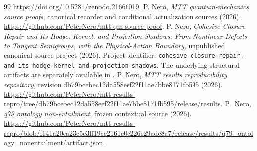 \documentclass[11pt,a4paper]{article}
\begin{document}
\begin{thebibliography}{99}
\url{https://doi.org/10.5281/zenodo.21666019}.
P. Nero, \emph{MTT quantum-mechanics source proofs},
canonical recorder and conditional actualization sources (2026).
\url{https://github.com/PeterNero/mtt-qm-source-proof}.
P. Nero, \emph{Cohesive Closure Repair and Its Hodge, Kernel, and Projection
Shadows: From Nonlinear Defects to Tangent Semigroups, with the
Physical-Action Boundary}, unpublished canonical source project (2026).
Project identifier:
\texttt{cohesive-closure-repair-and-its-hodge-kernel-and-projection-shadows}.
The underlying structural artifacts are separately available in \cite{NeroResults}.
P. Nero, \emph{MTT results reproducibility repository},
revision db79bcebec12da558eef22f11ae7bbe8171fb595 (2026).
\url{https://github.com/PeterNero/mtt-results-repro/tree/db79bcebec12da558eef22f11ae7bbe8171fb595/release/results}.
P.~Nero, \emph{q79 ontology non-entailment}, frozen contextual source (2026).
\url{https://github.com/PeterNero/mtt-results-repro/blob/f141a20ea23c5c3ff19cc2161c0e226e29ade8a7/release/results/q79_ontology_nonentailment/artifact.json}.
\end{thebibliography}
\end{document}
